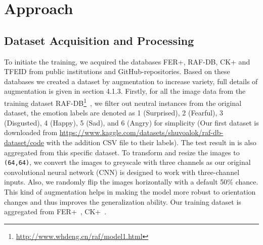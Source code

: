 


\section{Approach}
\label{sec:approach}

\subsection{Dataset Acquisition and Processing}
To initiate the training, we acquired the databases FER+, RAF-DB, CK+ and TFEID from public institutions and GitHub-repositories.
Based on these databases we created a dataset by augmentation to increase variety, 
full details of augmentation is given in section 4.1.3.
Firstly, 
for all the image data from the training dataset RAF-DB\footnote{\url{http://www.whdeng.cn/raf/model1.html}}~\cite{li2017reliable,li2019reliable}, 
we filter out neutral instances from the original dataset, 
the emotion labels are denoted as 1 (Surprised), 2 (Fearful), 3 (Disgusted), 
4 (Happy), 5 (Sad), and 6 (Angry) for simplicity 
(Our first dataset is downloaded from \url{https://www.kaggle.com/datasets/shuvoalok/raf-db-dataset/code} with the addition CSV file to their labels). 
The test result in  is also aggregated from this specific dataset.
To transform and resize the images to \texttt{(64,64)}, 
we convert the images to greyscale with three channels as our original convolutional neural network (CNN) is designed to work with three-channel inputs. 
Also, we randomly flip the images horizontally with a default 50\% chance. 
This kind of augmentation helps in making the model more robust to orientation changes and thus improves the generalization ability. 
Our training dataset is aggregated from FER+~\cite{BarsoumZCZ16}, CK+~\cite{LuceyCKSAM10}.

